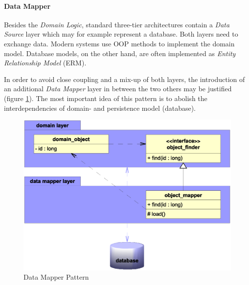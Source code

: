 %
%
%
%
%
%
%

\paragraph{Data Mapper}
\label{data_mapper_heading}

Besides the \emph{Domain Logic}, standard three-tier architectures contain a
\emph{Data Source} layer which may for example represent a database. Both layers
need to exchange data. Modern systems use OOP methods to implement the domain
model. Database models, on the other hand, are often implemented as
\emph{Entity Relationship Model} (ERM).

In order to avoid close coupling and a mix-up of both layers, the introduction
of an additional \emph{Data Mapper} layer \cite{fowler2002} in between the two
others may be justified (figure \ref{datamapper_figure}). The most important
idea of this pattern is to abolish the interdependencies of domain- and
persistence model (database).

\begin{figure}[ht]
    \begin{center}
        \includegraphics[scale=0.3]{vector/datamapper.eps}
        \caption{Data Mapper Pattern}
        \label{datamapper_figure}
    \end{center}
\end{figure}

